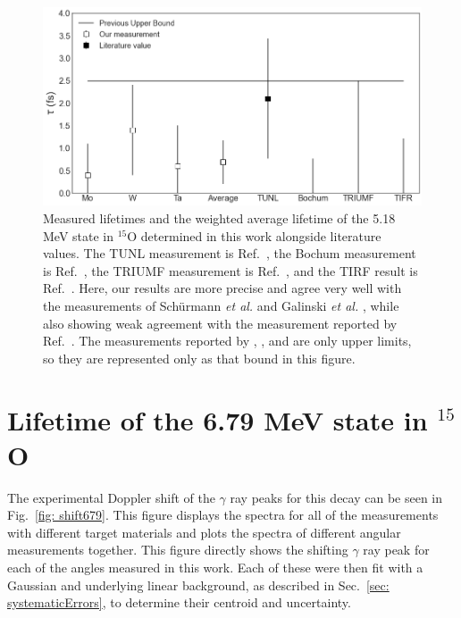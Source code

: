 \begin{figure}
\centering
\includegraphics[width=\linewidth]{figures/lifetimes617.png}
\caption{Measured lifetimes and the weighted average lifetime of the 5.18 MeV state in $^{15}$O determined in this work alongside literature values. The TUNL measurement is Ref.\ \cite{Bertone2001}, the Bochum measurement is Ref.\ \cite{Schurmann2008}, the TRIUMF measurement is Ref.\ \cite{Galinski2014}, and the TIRF result is Ref.\ \cite{Sharma2020}. Here, our results are more precise and agree very well with the measurements of Sch{\"u}rmann \textit{et al.} \cite{Schurmann2008} and Galinski \textit{et al.} \cite{Galinski2014}, while also showing weak agreement with the measurement reported by Ref.\ \cite{Bertone2001}. The measurements reported by \citet{Schurmann2008}, \citet{Galinski2014}, and \citet{Sharma2020} are only upper limits, so they are represented only as that bound in this figure.}
\label{fig: lifetimes617}
\end{figure}



\section{Lifetime of the 6.79 MeV state in $^{15}$O}
\label{sec: lifetime679}


The experimental Doppler shift of the $\gamma$ ray peaks for this decay can be seen in Fig.\ \ref{fig: shift679}. This figure displays the spectra for all of the measurements with different target materials and plots the spectra of different angular measurements together. This figure directly shows the shifting $\gamma$ ray peak for each of the angles measured in this work. Each of these were then fit with a Gaussian and underlying linear background, as described in Sec.\ \ref{sec: systematicErrors}, to determine their centroid and uncertainty. 



